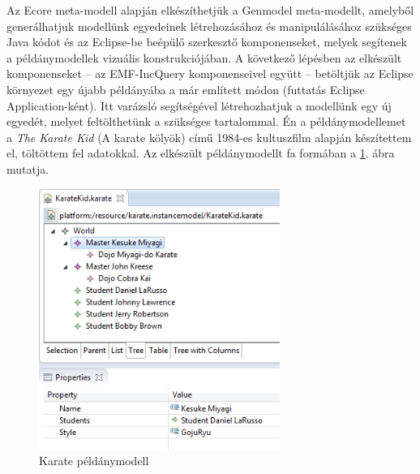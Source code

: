 Az Ecore meta-modell alapján elkészíthetjük a Genmodel meta-modellt, amelyből generálhatjuk modellünk egyedeinek létrehozásához és manipulálásához szükséges Java kódot és az Eclipse-be beépülő szerkesztő komponenseket, melyek segítenek a példánymodellek vizuális konstrukciójában.
A következő lépésben az elkészült komponenseket -- az EMF-IncQuery komponenseivel együtt -- betöltjük az Eclipse környezet egy újabb példányába a már említett módon (futtatás Eclipse Application-ként).
Itt varázsló segítségével létrehozhatjuk a modellünk egy új egyedét, melyet feltölthetünk a szükséges tartalommal.
Én a példánymodellemet a \emph{The Karate Kid} (A karate kölyök) című 1984-es kultuszfilm alapján készítettem el, töltöttem fel adatokkal.
Az elkészült példánymodellt fa formában a \ref{fig:karateInstanceModel}. ábra mutatja.
%
\begin{figure}[htb]
\centering
\includegraphics[width=0.70\textwidth]{figures/karate-instance-tree-with-properties.png}
\caption{Karate példánymodell}
\label{fig:karateInstanceModel}
\end{figure}
%

